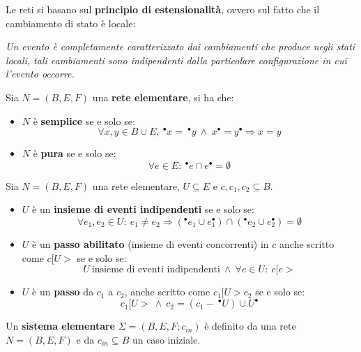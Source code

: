 Le reti si basano sul \textbf{principio di estensionalità}, ovvero sul fatto che il cambiamento di stato è locale:
\begin{center}
    \textit{Un evento è completamente caratterizzato dai cambiamenti che produce negli stati locali, tali cambiamenti sono indipendenti dalla particolare configurazione in cui l'evento occorre.}
\end{center}
\begin{definizione}[]
    Sia $N = (B, E, F)$ una \textbf{rete elementare}, si ha che:
    \begin{itemize}
        \item $N$ è \textbf{semplice} se e solo se:
        \begin{equation}
            \forall x, y \in B \cup E, \ ^{\bullet} x = \ ^{\bullet} y \ \land \ x^{\bullet} = y^{\bullet} \Rightarrow x = y
        \end{equation}
        \item $N$ è \textbf{pura} se e solo se:
        \begin{equation}
            \forall e \in E: \ ^{\bullet}e \cap e^{\bullet} = \emptyset
        \end{equation}
    \end{itemize}
\end{definizione}
\begin{definizione}
    Sia $N = (B, E, F)$ una rete elementare, $U \subseteq E$ e $c, c_1, c_2 \subseteq B$.
    \begin{itemize}
        \item $U$ è un \textbf{insieme di eventi indipendenti} se e solo se:
        \begin{equation}
            \forall e_1, e_2 \in U: \ e_1 \neq e_2 \Rightarrow (^{\bullet}e_1 \cup e_1^{\bullet}) \cap (^{\bullet}e_2 \cup e_2^{\bullet}) = \emptyset
        \end{equation}
        \item $U$ è un \textbf{passo abilitato} (insieme di eventi concorrenti) in $c$ anche scritto come $c[U >$ se e solo se:
        \begin{equation}
            U \ \text{insieme di eventi indipendenti} \ \land \ \forall e \in U: \ c[e >
        \end{equation}
        \item $U$ è un \textbf{passo} da $c_1$ a $c_2$, anche scritto come $c_1[U > c_2$ se e solo se:
        \begin{equation}
            c_1 [ U > \ \land \ c_2 = (c_1 - \ ^{\bullet} U) \cup U^{\bullet}
        \end{equation}
    \end{itemize}
\end{definizione}
Un \textbf{sistema elementare} $\Sigma = (B, E, F; c_{in})$ è definito da una rete $N = (B, E, F)$ e da $c_{in} \subseteq B$ un caso iniziale.

